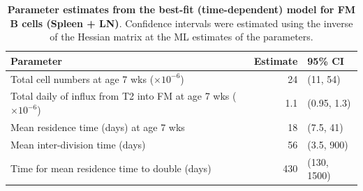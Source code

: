 \documentclass[11pt]{article}
\begin{document}
\vspace{1cm}


\begin{table}[h!]
	\begin{center}
		\renewcommand{\arraystretch}{1.25}
		\begin{tabular}{ l r l } 
			\toprule 
			\textbf{Parameter}  &  {\small Estimate}  &  {\small 95\% CI} \\ 
			\toprule
			Total cell numbers at age 7 wks ($\times 10^{-6}$)      & 24      &  (11, 54)  \\ 
			Total daily of influx from T2 into FM at age 7 wks ($\times 10^{-6}$)           & 1.1      &  (0.95, 1.3)  \\
			Mean residence time (days) at age 7 wks       & 18     &  (7.5, 41)  \\ 
			Mean inter-division time (days)         & 56      &  (3.5, 900)  \\
			Time for mean residence time to double (days)    & 430       &  (130, 1500)  \\
			\hline
			\toprule 
		\end{tabular}
	\end{center}
	\caption{\small \textbf{Parameter estimates from the best-fit (time-dependent) model for FM B cells (Spleen + LN)}.  Confidence intervals were estimated using the inverse of the Hessian matrix at the ML estimates of the parameters.}
	\label{tab:FM-parestm}
\end{table} 

\vspace{1cm}
\end{document}
